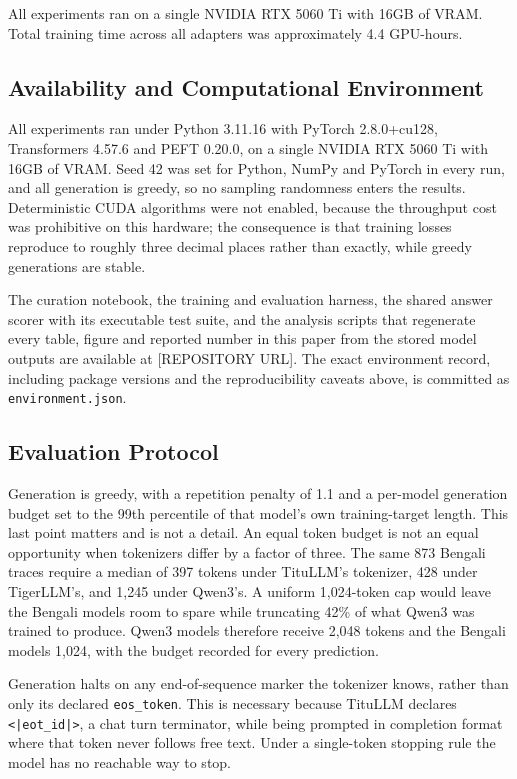 All experiments ran on a single NVIDIA RTX 5060 Ti with 16GB of VRAM. Total
training time across all adapters was approximately 4.4 GPU-hours.

\subsection{Availability and Computational Environment}

All experiments ran under Python 3.11.16 with PyTorch 2.8.0+cu128,
Transformers 4.57.6 and PEFT 0.20.0, on a single NVIDIA RTX 5060 Ti with 16GB
of VRAM. Seed 42 was set for Python, NumPy and PyTorch in every run, and all
generation is greedy, so no sampling randomness enters the results.
Deterministic CUDA algorithms were not enabled, because the throughput cost was
prohibitive on this hardware; the consequence is that training losses reproduce
to roughly three decimal places rather than exactly, while greedy generations
are stable.

The curation notebook, the training and evaluation harness, the shared answer
scorer with its executable test suite, and the analysis scripts that regenerate
every table, figure and reported number in this paper from the stored model
outputs are available at [REPOSITORY URL]. The exact environment record,
including package versions and the reproducibility caveats above, is committed
as \texttt{environment.json}.

\subsection{Evaluation Protocol}

Generation is greedy, with a repetition penalty of 1.1 and a per-model
generation budget set to the 99th percentile of that model's own training-target
length. This last point matters and is not a detail. An equal token budget is
not an equal opportunity when tokenizers differ by a factor of three. The same
873 Bengali traces require a median of 397 tokens under TituLLM's tokenizer, 428
under TigerLLM's, and 1,245 under Qwen3's. A uniform 1,024-token cap would leave
the Bengali models room to spare while truncating 42\% of what Qwen3 was trained
to produce. Qwen3 models therefore receive 2,048 tokens and the Bengali models
1,024, with the budget recorded for every prediction.

Generation halts on any end-of-sequence marker the tokenizer knows, rather than
only its declared \texttt{eos\_token}. This is necessary because TituLLM
declares \texttt{<|eot\_id|>}, a chat turn terminator, while being prompted in
completion format where that token never follows free text. Under a
single-token stopping rule the model has no reachable way to stop.

